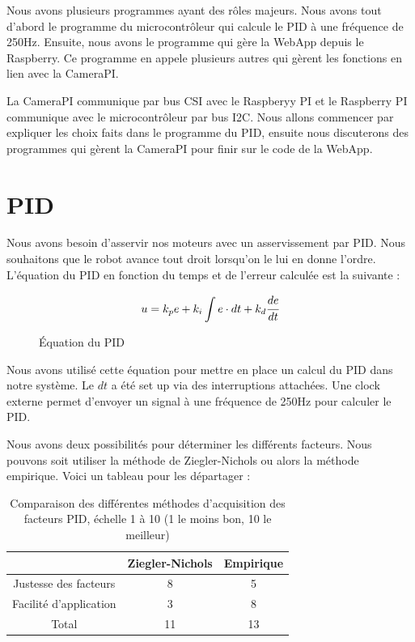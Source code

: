 \documentclass[
	a4paper,									%
	11pt,										%
	twoside,									%
	openright,									%
	notitlepage,									%
	parskip=half,								%
]{scrreprt}										%
\begin{document}
Nous avons plusieurs programmes ayant des rôles majeurs. Nous avons tout d'abord le programme du 
microcontrôleur qui calcule le PID à une fréquence de 250Hz. Ensuite, nous avons le programme qui gère
la WebApp depuis le Raspberry. Ce programme en appele plusieurs autres qui gèrent les fonctions en lien 
avec la CameraPI. \par

La CameraPI communique par bus CSI avec le Raspberyy PI et le Raspberry PI communique avec le microcontrôleur
par bus I2C. Nous allons commencer par expliquer les choix faits dans le programme du PID, ensuite nous discuterons
des programmes qui gèrent la CameraPI pour finir sur le code de la WebApp. \par


\section{PID}

Nous avons besoin d'asservir nos moteurs avec un asservissement par PID. Nous souhaitons que le robot avance
tout droit lorsqu'on le lui en donne l'ordre. L'équation du PID en fonction du temps et de l'erreur calculée 
est la suivante : 

\begin{figure}[h]
	\[u=k_pe + k_i \int e \cdot dt + k_d \cfrac{de}{dt}\] 
	\caption{Équation du PID}
	\label{eq1}
\end{figure}

Nous avons utilisé cette équation pour mettre en place un calcul du PID dans notre système. Le $dt$ a été 
set up via des interruptions attachées. Une clock externe permet d'envoyer un signal à une fréquence de 250Hz
pour calculer le PID. \par

Nous avons deux possibilités pour déterminer les différents facteurs. Nous pouvons soit utiliser la méthode 
de Ziegler-Nichols ou alors la méthode empirique. Voici un tableau pour les départager : 

\begin{table}[!ht]
    \begin{center}
        \vspace{5mm}
        \label{tab:table5}
        \begin{tabular}{c|c|c} %
            \toprule
            \textbf{ } & \textbf{Ziegler-Nichols} & \textbf{Empirique}\\
            \midrule
            Justesse des facteurs & 8 & 5\\
            Facilité d'application & 3 & 8\\
            \midrule
			Total & 11 & 13\\
            \bottomrule
        \end{tabular}
    \end{center}    
	\caption{Comparaison des différentes méthodes d'acquisition des facteurs PID, échelle 1 à 10 (1 le moins bon, 10 le meilleur)}
\end{table}
\end{document}
